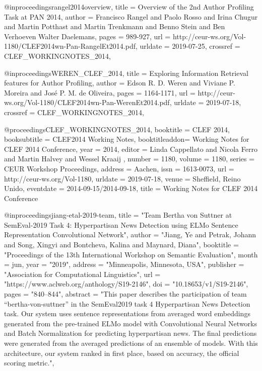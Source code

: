 {@inproceedings{rangel2014overview,
  title        = {{O}verview of the 2nd {A}uthor {P}rofiling {T}ask at {PAN} 2014},
  author       = {Francisco Rangel and Paolo Rosso and Irina Chugur and Martin Potthast and Martin Trenkmann and Benno Stein and Ben Verhoeven Walter Daelemans},
  pages        = {989-927},
  url          = {http://ceur-ws.org/Vol-1180/CLEF2014wn-Pan-RangelEt2014.pdf},
  urldate      = {2019-07-25},
  crossref = {CLEF_WORKINGNOTES_2014},
}

@inproceedings{WEREN_CLEF_2014,
  title        = {{E}xploring {I}nformation {R}etrieval features for {A}uthor {P}rofiling},
  author       = {Edson R. D. Weren and Viviane P. Moreira and José P. M. de Oliveira},
  pages        = {1164-1171},
  url          = {http://ceur-ws.org/Vol-1180/CLEF2014wn-Pan-WerenEt2014.pdf},
  urldate      = {2019-07-18},
  crossref = {CLEF_WORKINGNOTES_2014},
}

@proceedings{CLEF_WORKINGNOTES_2014,
  booktitle    = {CLEF 2014},
  booksubtitle = {{CLEF2014} {Working} {Notes}},
  booktitleaddon= {Working Notes for CLEF 2014 Conference},
  year = {2014},
  editor       = {Linda Cappellato and Nicola Ferro and Martin Halvey and Wessel Kraaij },
  number = {1180},
  volume = {1180},
  series = {CEUR Workshop Proceedings},
  address = {Aachen},
  issn = {1613-0073},
  url = {http://ceur-ws.org/Vol-1180},
  urldate      = {2019-07-18},
  venue        = {Sheffield, Reino Unido},
  eventdate    = {2014-09-15/2014-09-18},
  title = {Working Notes for CLEF 2014 Conference}
}

@inproceedings{jiang-etal-2019-team,
    title = "Team Bertha von Suttner at {S}em{E}val-2019 Task 4: Hyperpartisan News Detection using {ELM}o Sentence Representation Convolutional Network",
    author = "Jiang, Ye  and
      Petrak, Johann  and
      Song, Xingyi  and
      Bontcheva, Kalina  and
      Maynard, Diana",
    booktitle = "Proceedings of the 13th International Workshop on Semantic Evaluation",
    month = jun,
    year = "2019",
    address = "Minneapolis, Minnesota, USA",
    publisher = "Association for Computational Linguistics",
    url = "https://www.aclweb.org/anthology/S19-2146",
    doi = "10.18653/v1/S19-2146",
    pages = "840--844",
    abstract = "This paper describes the participation of team {``}bertha-von-suttner{''} in the SemEval2019 task 4 Hyperpartisan News Detection task. Our system uses sentence representations from averaged word embeddings generated from the pre-trained ELMo model with Convolutional Neural Networks and Batch Normalization for predicting hyperpartisan news. The final predictions were generated from the averaged predictions of an ensemble of models. With this architecture, our system ranked in first place, based on accuracy, the official scoring metric.",
}

}
